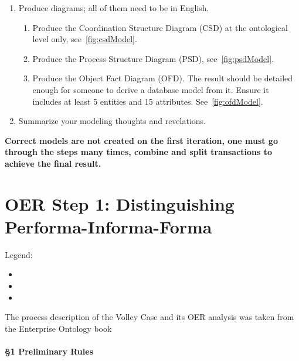\begin{enumerate}
    \item Produce diagrams; all of them need to be in English.
    \begin{enumerate}
    	\item Produce the Coordination Structure Diagram (CSD) at the ontological level only, see~\cref{fig:csdModel}.
    	\item Produce the Process Structure Diagram (PSD), see~\cref{fig:psdModel}.
    	\item Produce the Object Fact Diagram (OFD). The result should be detailed enough for someone to derive a database model from it. Ensure it includes at least 5 entities and 15 attributes. See~\cref{fig:ofdModel}.
    \end{enumerate}
    \item Summarize your modeling thoughts and revelations. 
\end{enumerate}

\textbf{Correct models are not created on the first iteration, one must go through the steps many times, combine and split transactions to achieve the final result.} 

\section{OER Step 1: Distinguishing Performa-Informa-Forma}

Legend: 
\begin{itemize}
    \item {}
    \item {}
    \item {}
\end{itemize}

The process description of the Volley Case and its OER analysis was taken from the Enterprise Ontology book~\cite{dietz2020enterprise}

\paragraph{\S 1 Preliminary Rules}

